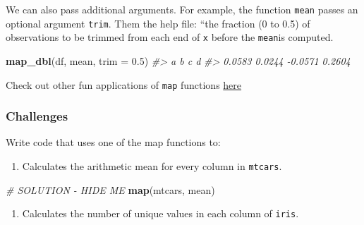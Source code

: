 \documentclass[]{book}
\newenvironment{Shaded}{\begin{snugshade}}{\end{snugshade}}
\newcommand{\KeywordTok}[1]{\textcolor[rgb]{0.13,0.29,0.53}{\textbf{#1}}}
\newcommand{\DataTypeTok}[1]{\textcolor[rgb]{0.13,0.29,0.53}{#1}}
\newcommand{\FloatTok}[1]{\textcolor[rgb]{0.00,0.00,0.81}{#1}}
\newcommand{\StringTok}[1]{\textcolor[rgb]{0.31,0.60,0.02}{#1}}
\newcommand{\CommentTok}[1]{\textcolor[rgb]{0.56,0.35,0.01}{\textit{#1}}}
\newcommand{\OperatorTok}[1]{\textcolor[rgb]{0.81,0.36,0.00}{\textbf{#1}}}
\newcommand{\NormalTok}[1]{#1}
\providecommand{\tightlist}{%
  \setlength{\itemsep}{0pt}\setlength{\parskip}{0pt}}
\begin{document}
We can also pass additional arguments. For example, the function
\texttt{mean} passes an optional argument \texttt{trim}. Them the help
file: ``the fraction (0 to 0.5) of observations to be trimmed from each
end of \texttt{x} before the \texttt{mean}is computed.

\begin{Shaded}
\begin{Highlighting}[]
\KeywordTok{map_dbl}\NormalTok{(df, mean, }\DataTypeTok{trim =} \FloatTok{0.5}\NormalTok{)}
\CommentTok{#>       a       b       c       d }
\CommentTok{#>  0.0583  0.0244 -0.0571  0.2604}
\end{Highlighting}
\end{Shaded}

Check out other fun applications of \texttt{map} functions
\href{https://r4ds.had.co.nz/iteration.html\#the-map-functions}{here}

\subsubsection*{Challenges}\label{challenges-17}

Write code that uses one of the map functions to:

\begin{enumerate}
\def\labelenumi{\arabic{enumi}.}
\tightlist
\item
  Calculates the arithmetic mean for every column in \texttt{mtcars}.
\end{enumerate}

\begin{Shaded}
\begin{Highlighting}[]
\CommentTok{# SOLUTION - HIDE ME}
\KeywordTok{map}\NormalTok{(mtcars, mean)}
\end{Highlighting}
\end{Shaded}

\begin{enumerate}
\def\labelenumi{\arabic{enumi}.}
\setcounter{enumi}{1}
\tightlist
\item
  Calculates the number of unique values in each column of
  \texttt{iris}.
\end{enumerate}

\begin{Shaded}
\end{Shaded}
\end{document}
